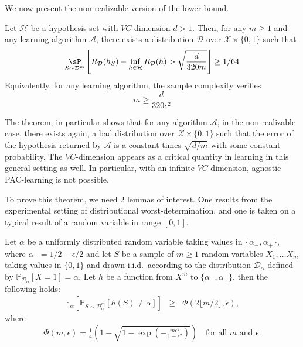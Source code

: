 We now present the non-realizable version of the lower bound. 
\begin{theorem}
    Let $\mathcal{H}$ be a hypothesis set with $VC$-dimension $d>1$. Then, for any $m\geq 1$ and any learning algorithm $\mathcal{A}$, there exists a distribution $\mathcal{D}$ over $\mathcal{X}\times \{0,1\}$ such that 
    \begin{equation}
        \underset{S\sim\mathcal{D}^{m}}{\sP} \left[ R_{\mathcal{D}}(h_{S}) - \inf_{h\in\mathcal{H}}R_{\mathcal{D}}(h) > \sqrt{\frac{d}{320m}} \right] \geq 1/64
    \end{equation}
    Equivalently, for any learning algorithm, the sample complexity verifies
    \begin{equation}
        m\geq \frac{d}{320\epsilon^{2}}
    \end{equation}
\end{theorem}
The theorem, in particular shows that for any algorithm $\mathcal{A}$, in the non-realizable case, there exists again, a bad distribution over $\mathcal{X}\times\{0,1\}$ such that the error of the hypothesis returned by $\mathcal{A}$ is a constant times $\sqrt{d/m}$ with some constant probability. The $VC$-dimension appears as a critical quantity in learning in this general setting as well. In particular, with an infinite $VC$-dimension, agnostic PAC-learning is not possible. 

To prove this theorem, we need 2 lemmas of interest. One results from the experimental setting of distributional worst-determination, and one is taken on a typical result of a random variable in range $[0,1]$. 
\begin{lemma}
    Let $\alpha$ be a uniformly distributed random variable taking values in $\{\alpha_{-},\alpha_{+}\}$, where $\alpha_{-}=1/2-\epsilon/2$ and let $S$ be a sample of $m\geq 1$ random variables $X_{1},\dots X_m$ taking values in $\{0,1\}$ and drawn i.i.d.\ according to the distribution 
$\mathcal{D}_{\alpha}$ defined by $\mathbb{P}_{\mathcal{D}_{\alpha}}[X = 1] = \alpha$. Let $h$ be a function from $X^{m}$ to $\{\alpha_{-}, \alpha_{+}\}$, 
then the following holds:
\begin{align}
\mathbb{E}_{\alpha} \left[ \mathbb{P}_{S \sim \mathcal{D}_{\alpha}^{m}}[h(S) \neq \alpha] \right] 
\;\;\geq\;\; \Phi(2\lfloor m/2 \rfloor, \epsilon),
\tag{3.39}
\end{align}
where
\begin{equation}
    \Phi(m, \epsilon) = \tfrac{1}{4} \left(1 - \sqrt{1 - \exp\!\left(-\tfrac{m \epsilon^{2}}{1 - \epsilon^{2}}\right)}\right)
\quad \text{for all $m$ and $\epsilon$.}
\end{equation}
\end{lemma}

